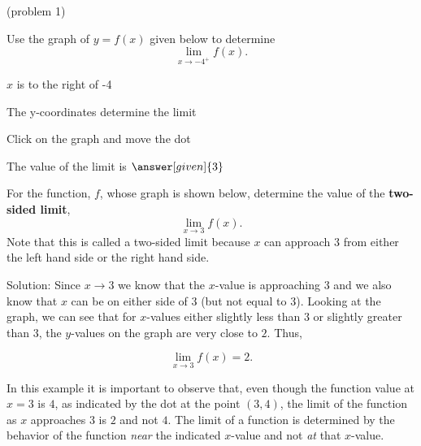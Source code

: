 \documentclass{ximera}
\begin{document}
\begin{problem}(problem 1)




Use the graph of $y = f(x)$ given below to determine
  \[
  \lim_{x\to -4^+} f(x).
  \]
  
    \begin{hint}
      $x$ is to the right of -4
    \end{hint}
    \begin{hint}
      The y-coordinates determine the limit
    \end{hint}
		\begin{hint}
		  Click on the graph and move the dot
		\end{hint}
		The value of the limit is
		 $\answer[given]{3}$

\end{problem}


\begin{example}[example 2]
For the function, $f$, whose graph is shown below, determine the value of the \textbf{two-sided limit}, 
\[
\lim_{x\to 3} f(x).
\]
Note that this is called a two-sided limit because $x$ can 
approach $3$ from either the left hand side or the right hand side.



\vspace{.25in}
Solution: Since $x \to 3$ we know that the $x$-value is approaching $3$ and we also know 
that $x$ can be on either side of $3$ (but not equal to 3). 
Looking at the graph, we can see that for $x$-values either slightly less than $3$ or slightly greater than $3$, 
the $y$-values on the graph are very close to $2$. Thus, 

\[
\lim_{x\to 3} f(x) = 2.
\]

In this example it is important to observe that, even though the function value at $x= 3$ is $4$, 
as indicated by the dot at the point $(3,4)$, the limit of the function as $x$ approaches $3$ is $2$ and not $4$.  
The limit of a function is determined by the behavior of the function \textit{near} the 
indicated $x$-value and not \textit{at} that $x$-value.\\

\end{example}
\end{document}
